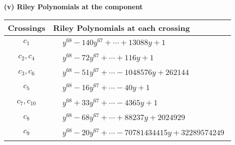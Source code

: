 \documentclass[1p]{elsarticle_modified}
\theoremstyle{definition}
\begin{document}
\newpage\renewcommand{\arraystretch}{1}
\flushleft \textbf{(v) Riley Polynomials at the component}\newline \\
\begin{tabular}{m{50pt}|m{274pt}}
Crossings & \hspace{64pt}Riley Polynomials at each crossing \\
\hline $$\begin{aligned}c_{1}\end{aligned}$$&$\begin{aligned}
&y^{68}-140 y^{67}+\cdots+13088 y+1
\end{aligned}$\\
\hline $$\begin{aligned}c_{2},c_{4}\end{aligned}$$&$\begin{aligned}
&y^{68}-72 y^{67}+\cdots+116 y+1
\end{aligned}$\\
\hline $$\begin{aligned}c_{3},c_{6}\end{aligned}$$&$\begin{aligned}
&y^{68}-51 y^{67}+\cdots-1048576 y+262144
\end{aligned}$\\
\hline $$\begin{aligned}c_{5}\end{aligned}$$&$\begin{aligned}
&y^{68}-16 y^{67}+\cdots-40 y+1
\end{aligned}$\\
\hline $$\begin{aligned}c_{7},c_{10}\end{aligned}$$&$\begin{aligned}
&y^{68}+33 y^{67}+\cdots-4365 y+1
\end{aligned}$\\
\hline $$\begin{aligned}c_{8}\end{aligned}$$&$\begin{aligned}
&y^{68}-68 y^{67}+\cdots+88237 y+2024929
\end{aligned}$\\
\hline $$\begin{aligned}c_{9}\end{aligned}$$&$\begin{aligned}
&y^{68}-20 y^{67}+\cdots-70781434415 y+32289574249
\end{aligned}$\\

\end{tabular}
\end{document}
